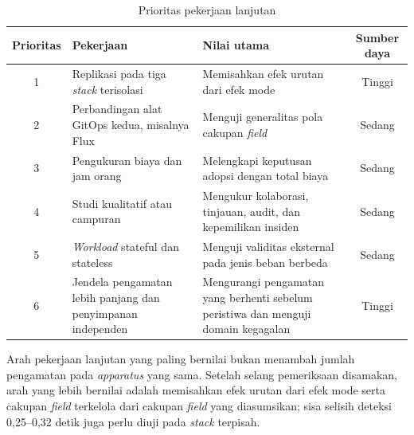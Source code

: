 \begin{table}[H]
  \centering
  \small
  \caption{Prioritas pekerjaan lanjutan}
  \label{tab:lanjutan}
  \begin{tabularx}{\textwidth}{|c|X|X|c|}
    \hline
    Prioritas & Pekerjaan & Nilai utama & Sumber daya \\
    \hline
    1 & Replikasi pada tiga \textit{stack} terisolasi & Memisahkan efek urutan dari efek mode & Tinggi \\
    \hline
    2 & Perbandingan alat GitOps kedua, misalnya Flux & Menguji generalitas pola cakupan \textit{field} & Sedang \\
    \hline
    3 & Pengukuran biaya dan jam orang & Melengkapi keputusan adopsi dengan total biaya & Sedang \\
    \hline
    4 & Studi kualitatif atau campuran & Mengukur kolaborasi, tinjauan, audit, dan kepemilikan insiden & Sedang \\
    \hline
    5 & \textit{Workload} stateful dan stateless & Menguji validitas eksternal pada jenis beban berbeda & Sedang \\
    \hline
    6 & Jendela pengamatan lebih panjang dan penyimpanan independen & Mengurangi pengamatan yang berhenti sebelum peristiwa dan menguji domain kegagalan & Tinggi \\
    \hline
  \end{tabularx}
\end{table}

Arah pekerjaan lanjutan yang paling bernilai bukan menambah jumlah pengamatan pada \textit{apparatus} yang sama. Setelah selang pemeriksaan disamakan, arah yang lebih bernilai adalah memisahkan efek urutan dari efek mode serta cakupan \textit{field} terkelola dari cakupan \textit{field} yang diasumsikan; sisa selisih deteksi 0,25--0,32 detik juga perlu diuji pada \textit{stack} terpisah.
